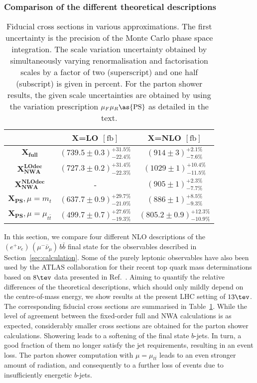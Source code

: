 \subsubsection{Comparison of the different theoretical descriptions}

\begin{table}
\centering
\begingroup
\def\arraystretch{1.3}
\begin{tabular}{|c|c|c|}
\hline
& X=LO $\left[\mathrm{fb}\right]$ & X=NLO $\left[\mathrm{fb}\right]$\\
\hline
$\mathbf{X_{full}}$ & $\left( 739.5\pm   0.3\right)^{ + 31.5\%}_{-22.4\%}$ & $\left( 914\pm   3\right)^{ +  2.1\%}_{ -7.6\%}$\\
$\mathbf{X_{NWA}^{LOdec}}$& $\left( 727.3\pm   0.2\right)^{ + 31.4\%}_{-22.3\%}$ & $\left( 1029\pm   1\right)^{ + 10.4\%}_{-11.5\%}$\\
$\mathbf{X_{NWA}^{NLOdec}}$ & - & $\left( 905\pm   1\right)^{ +  2.3\%}_{ -7.7\%}$\\
$\mathbf{X_{PS}}, \mu=m_t$ & $\left( 637.7\pm   0.9\right)^{ + 29.7\%}_{-21.0\%}$ & $\left( 886\pm   1\right)^{ +  8.5\%}_{ -9.3\%}$\\
$\mathbf{X_{PS}}, \mu=\mu_{t\bar{t}}$ & $\left( 499.7\pm   0.7\right)^{ + 27.6\%}_{-19.3\%}$ & $\left( 805.2\pm   0.9\right)^{ + 12.3\%}_{-10.9\%}$\\
\hline
\end{tabular}
\endgroup
\caption{\label{tab:xs}%
  Fiducial cross sections in various approximations. The first
  uncertainty is the precision of the Monte Carlo phase space integration.
  The scale variation uncertainty obtained by simultaneously varying
  renormalisation and factorisation scales by a factor of two
  (superscript) and one half (subscript) is given in percent.
  For the parton shower results, the  given scale uncertainties are
  obtained by using the variation prescription $\mu_F\mu_R\as{\mathrm{PS}}$
  as detailed in the text.}
\end{table}

In this section, we compare four different NLO descriptions of the $(e^+ \nu_e)\,(\mu^- \bar{\nu}_{\mu})\,b\bar b$ final state
for the  observables described in Section~\ref{sec:calculation}.
Some of the purely leptonic observables have also been used by the ATLAS collaboration
for their recent top quark mass determinations based on $8\tev$ data presented in Ref.~\cite{ATLAS-CONF-2017-044}.
Aiming to quantify the relative differences of the theoretical descriptions,
which should only mildly depend on the centre-of-mass energy,
we show results at the present LHC setting of $13\tev$.
The corresponding fiducial cross sections are summarised in Table~\ref{tab:xs}.
While the level of agreement between the fixed-order full and NWA
calculations is as expected, considerably smaller cross
sections are obtained for the parton shower calculations. Showering leads to a softening
of the final state $b$-jets. In turn, a good fraction of them no longer
satisfy the jet requirements, resulting in an event loss.
The parton shower computation
with $\mu=\mu_{t\bar t}$ leads to an even stronger amount of
radiation, and consequently to a further loss of events due to
insufficiently energetic $b$-jets.

